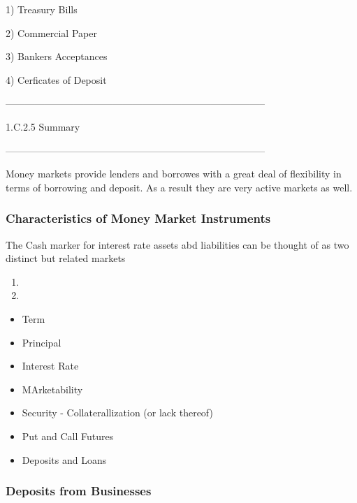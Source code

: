 1) Treasury Bills

2) Commercial Paper

3) Bankers Acceptances

4) Cerficates of Deposit




--------------------------------------------------------------------------------


1.C.2.5 Summary




--------------------------------------------------------------------------------




Money markets provide lenders and borrowes with a great deal of flexibility in terms of borrowing and deposit.
As a result they are very active markets as well.

\subsubsection*{Characteristics of Money Market Instruments}
The Cash marker for interest rate assets abd liabilities can be thought of as two distinct but related markets

\begin{enumerate}
\item
\item
\end{enumerate}



\begin{itemize}
\item Term
\item Principal
\item Interest Rate
\item MArketability
\item Security - Collaterallization (or lack thereof)
\item Put and Call Futures
\item Deposits and Loans
\end{itemize}


\subsubsection*{Deposits from Businesses}

